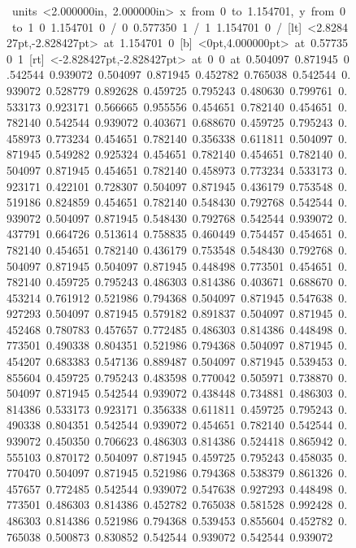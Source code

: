 
\begin{figure}
\begin{center}
\mbox{%
\beginpicture
\setcoordinatesystem units <2.000000in, 2.000000in>
\setplotarea x from 0 to 1.154701, y from 0 to 1
 0 1.154701 0 /
 0 0.577350 1 /
 1 1.154701 0 /
 [lt] <2.828427pt,-2.828427pt> at 1.154701 0 
 [b] <0pt,4.000000pt> at 0.577350 1 
 [rt] <-2.828427pt,-2.828427pt> at 0 0 
 at
  0.504097 0.871945
  0.542544 0.939072
  0.504097 0.871945
  0.452782 0.765038
  0.542544 0.939072
  0.528779 0.892628
  0.459725 0.795243
  0.480630 0.799761
  0.533173 0.923171
  0.566665 0.955556
  0.454651 0.782140
  0.454651 0.782140
  0.542544 0.939072
  0.403671 0.688670
  0.459725 0.795243
  0.458973 0.773234
  0.454651 0.782140
  0.356338 0.611811
  0.504097 0.871945
  0.549282 0.925324
  0.454651 0.782140
  0.454651 0.782140
  0.504097 0.871945
  0.454651 0.782140
  0.458973 0.773234
  0.533173 0.923171
  0.422101 0.728307
  0.504097 0.871945
  0.436179 0.753548
  0.519186 0.824859
  0.454651 0.782140
  0.548430 0.792768
  0.542544 0.939072
  0.504097 0.871945
  0.548430 0.792768
  0.542544 0.939072
  0.437791 0.664726
  0.513614 0.758835
  0.460449 0.754457
  0.454651 0.782140
  0.454651 0.782140
  0.436179 0.753548
  0.548430 0.792768
  0.504097 0.871945
  0.504097 0.871945
  0.448498 0.773501
  0.454651 0.782140
  0.459725 0.795243
  0.486303 0.814386
  0.403671 0.688670
  0.453214 0.761912
  0.521986 0.794368
  0.504097 0.871945
  0.547638 0.927293
  0.504097 0.871945
  0.579182 0.891837
  0.504097 0.871945
  0.452468 0.780783
  0.457657 0.772485
  0.486303 0.814386
  0.448498 0.773501
  0.490338 0.804351
  0.521986 0.794368
  0.504097 0.871945
  0.454207 0.683383
  0.547136 0.889487
  0.504097 0.871945
  0.539453 0.855604
  0.459725 0.795243
  0.483598 0.770042
  0.505971 0.738870
  0.504097 0.871945
  0.542544 0.939072
  0.438448 0.734881
  0.486303 0.814386
  0.533173 0.923171
  0.356338 0.611811
  0.459725 0.795243
  0.490338 0.804351
  0.542544 0.939072
  0.454651 0.782140
  0.542544 0.939072
  0.450350 0.706623
  0.486303 0.814386
  0.524418 0.865942
  0.555103 0.870172
  0.504097 0.871945
  0.459725 0.795243
  0.458035 0.770470
  0.504097 0.871945
  0.521986 0.794368
  0.538379 0.861326
  0.457657 0.772485
  0.542544 0.939072
  0.547638 0.927293
  0.448498 0.773501
  0.486303 0.814386
  0.452782 0.765038
  0.581528 0.992428
  0.486303 0.814386
  0.521986 0.794368
  0.539453 0.855604
  0.452782 0.765038
  0.500873 0.830852
  0.542544 0.939072
  0.542544 0.939072
}
\end{center}
\end{figure}
